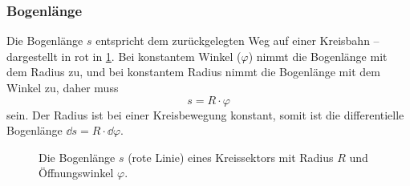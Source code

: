 \subsubsection{Bogenlänge}\label{subsubsec: bogenlänge}
Die Bogenlänge $s$ entspricht dem zurückgelegten Weg auf einer Kreisbahn -- dargestellt in rot in \cref{fig: bogenlaenge}. Bei konstantem Winkel ($\varphi$) nimmt die Bogenlänge mit dem Radius zu, und bei konstantem Radius nimmt die Bogenlänge mit dem Winkel zu, daher muss 
\begin{equation}\label{eq: def_bogenlänge}
    s = R\cdot \varphi
\end{equation}
sein. Der Radius ist bei einer Kreisbewegung konstant, somit ist die differentielle Bogenlänge $\dd s = R \cdot \dd \varphi$. 
\begin{figure}[htb]
    \centering
    \caption{Die Bogenlänge $s$ (rote Linie) eines Kreissektors mit Radius $R$ und Öffnungswinkel $\varphi$.}\label{fig: bogenlaenge}
\end{figure}

